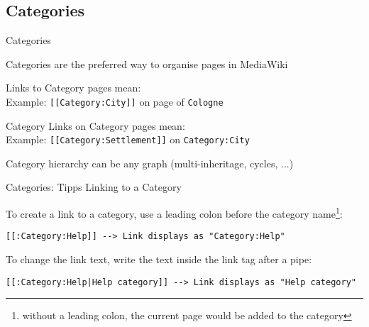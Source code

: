 \documentclass[aspectratio=1610,onlymath]{beamer}
\begin{document}
\subsection{Categories}

\begin{frame}[fragile]{Categories}

Categories are the preferred way to organise pages in MediaWiki


\bigskip
\alert{Links to Category pages mean:}   \\ 
 {\footnotesize \quad Example: \quad \texttt{[[Category:City]]} on page of \texttt{Cologne} }

\bigskip
\alert{Category Links on Category pages mean:}  \\
{\footnotesize \quad Example: \quad \texttt{[[Category:Settlement]]} on \texttt{Category:City}}

\bigskip
Category hierarchy can be any graph (multi-inheritage, cycles, ...)

%


\end{frame}


\begin{frame}[fragile]{Categories: Tipps}
\alert{Linking to a Category}

To create a link to a category, use a leading colon before the category name\footnote{without a leading colon, the current page would be added to the category}:
\begin{lstlisting}
[[:Category:Help]] --> Link displays as "Category:Help"
\end{lstlisting}

To change the link text, write the text inside the link tag after a pipe:
\begin{lstlisting}
[[:Category:Help|Help category]] --> Link displays as "Help category"
\end{lstlisting}

\end{frame}
\end{document}

